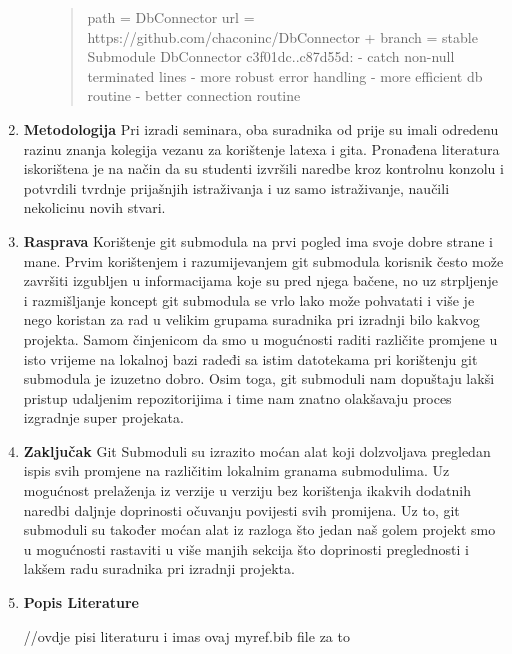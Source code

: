 \documentclass {article}
\begin{document}
\begin{enumerate}
\begin{enumerate}
\begin{quote}
\newline         path = DbConnector
\newline         url = https://github.com/chaconinc/DbConnector
\newline +       branch = stable
\newline Submodule DbConnector c3f01dc..c87d55d:
\newline   - catch non-null terminated lines
\newline   - more robust error handling
\newline   - more efficient db routine
\newline   - better connection routine
\newpage
    \end{quote}
      \end{enumerate}
\item {\textbf{Metodologija}}
\newline
\newline Pri izradi seminara, oba suradnika od prije su imali odredenu razinu znanja kolegija vezanu za korištenje latexa i gita. Pronađena literatura iskorištena je na način da su studenti izvršili naredbe kroz kontrolnu konzolu i potvrdili tvrdnje prijašnjih istraživanja i uz samo istraživanje, naučili nekolicinu novih stvari.
\newline
\item {\textbf{Rasprava}}
\newline
\newline Korištenje git submodula na prvi pogled ima svoje dobre strane i mane. \newline Prvim korištenjem i razumijevanjem git submodula korisnik često može završiti izgubljen u informacijama koje su pred njega bačene, no uz strpljenje i razmišljanje koncept git submodula se vrlo lako može pohvatati i više je nego koristan za rad u velikim grupama suradnika pri izradnji bilo kakvog projekta. Samom činjenicom da smo u mogućnosti raditi različite promjene u isto vrijeme na lokalnoj bazi radeđi sa istim datotekama pri korištenju git submodula je izuzetno dobro. Osim toga, git submoduli nam dopuštaju lakši pristup udaljenim repozitorijima i time nam znatno olakšavaju proces izgradnje super projekata.
\newline
\item {\textbf{Zaključak}} \newline
\newline
Git Submoduli su izrazito moćan alat koji dolzvoljava pregledan ispis svih promjene na različitim lokalnim granama submodulima. Uz mogućnost prelaženja iz verzije u verziju bez korištenja ikakvih dodatnih naredbi daljnje doprinosti očuvanju povijesti svih promijena. Uz to, git submoduli su također moćan alat iz razloga što jedan naš golem projekt smo u mogućnosti rastaviti u više manjih sekcija što doprinosti preglednosti i lakšem radu suradnika pri izradnji projekta.
\newpage
\item{\textbf{Popis Literature}}

//ovdje pisi literaturu i imas ovaj myref.bib file za to



\end{enumerate}
\end{document}
